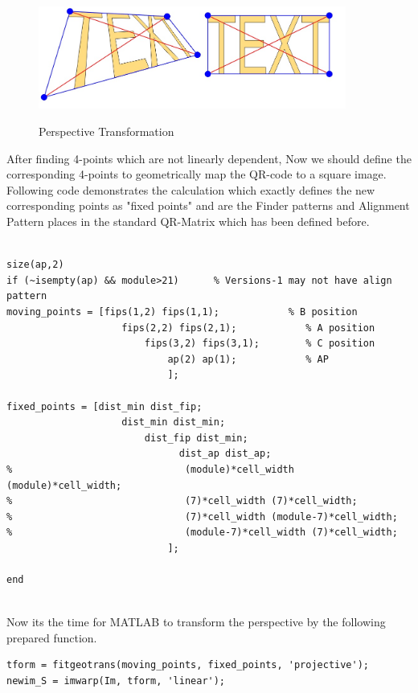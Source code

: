 \begin{figure}[H]
  \caption{Perspective Transformation\cite{StackPers}}
  \centering
    \includegraphics[width=0.9\textwidth]{figures/PersTrans.jpg}
    \label{fig:3.7}
\end{figure}

After finding 4-points which are not linearly dependent, Now we should define the corresponding 4-points to geometrically map the QR-code to a square image. Following code demonstrates the calculation which exactly defines the new corresponding points as "fixed points" and are the Finder patterns and Alignment Pattern places in the standard QR-Matrix which has been defined before.


\begin{lstlisting}

size(ap,2)
if (~isempty(ap) && module>21)      % Versions-1 may not have align pattern
moving_points = [fips(1,2) fips(1,1);            % B position
                    fips(2,2) fips(2,1);            % A position
                        fips(3,2) fips(3,1);        % C position
                            ap(2) ap(1);            % AP 
                            ];

fixed_points = [dist_min dist_fip;
                    dist_min dist_min;
                        dist_fip dist_min;
                              dist_ap dist_ap;
%                              (module)*cell_width (module)*cell_width;
%                              (7)*cell_width (7)*cell_width;
%                              (7)*cell_width (module-7)*cell_width;
%                              (module-7)*cell_width (7)*cell_width;
                            ];

end
       
\end{lstlisting}

Now its the time for MATLAB to transform the perspective by the following prepared function.
\begin{lstlisting}
tform = fitgeotrans(moving_points, fixed_points, 'projective');
newim_S = imwarp(Im, tform, 'linear');
\end{lstlisting}

